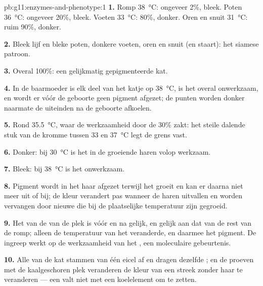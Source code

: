 \begin{solution}{pb:g11:enzymes-and-phenotype:1}
\textbf{1.} Romp \qty{38}{\celsius}: ongeveer 2\%, bleek. Poten
\qty{36}{\celsius}: ongeveer 20\%, bleek. Voeten \qty{33}{\celsius}: 80\%,
donker. Oren en snuit \qty{31}{\celsius}: ruim 90\%, donker.

\textbf{2.} Bleek lijf en bleke poten, donkere voeten, oren en snuit (en
staart): het siamese patroon.

\textbf{3.} Overal 100\%: een gelijkmatig gepigmenteerde kat.

\textbf{4.} In de baarmoeder is elk deel van het katje op
\qty{38}{\celsius}, is het  overal onwerkzaam, en wordt er vóór de
geboorte geen pigment afgezet; de punten worden donker naarmate de
uiteinden na de geboorte afkoelen.

\textbf{5.} Rond \qty{35.5}{\celsius}, waar de werkzaamheid door de 30\%
zakt: het steile dalende stuk van de kromme tussen 33 en
\qty{37}{\celsius} legt de grens vast.

\textbf{6.} Donker: bij \qty{30}{\celsius} is het  in de groeiende
haren volop werkzaam.

\textbf{7.} Bleek: bij \qty{38}{\celsius} is het  onwerkzaam.

\textbf{8.} Pigment wordt in het haar afgezet terwijl het groeit en kan er
daarna niet meer uit of bij; de kleur verandert pas wanneer de haren
uitvallen en worden vervangen door nieuwe die bij de plaatselijke
temperatuur zijn gegroeid.

\textbf{9.} Het  van de  van de plek is vóór en na gelijk,
en gelijk aan dat van de rest van de romp; alleen de temperatuur van het
 veranderde, en daarmee het pigment. De ingreep werkt op de
werkzaamheid van het , een moleculaire gebeurtenis.

\textbf{10.} Alle  van de kat stammen van één eicel af en dragen
dezelfde ; en de proeven met de kaalgeschoren plek veranderen de
kleur van een streek zonder haar  te veranderen --- een  valt
niet met een koelelement om te zetten.


\end{solution}
